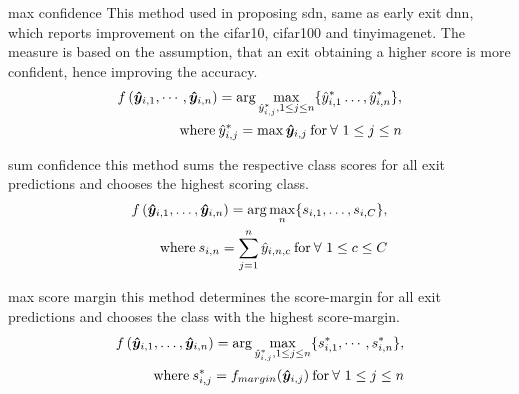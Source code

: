 \begin{enumdescript}
\begin{enumdescript}
				\item[max confidence] This method used in \cite{kaya_shallow-deep_nodate} proposing \gls{sdn}, same as early exit \gls{dnn}, which reports improvement on the \gls{cifar10}, \gls{cifar100} and \gls{tinyimagenet}. The measure is based on the assumption, that an exit obtaining a higher score is more confident, hence improving the accuracy.
				\begin{align}
				\begin{split}
				f\left(\bm{\hat{y}}_{i,1}, \cdots, \bm{\hat{y}}_{i,n} \right) = \arg \underset{{\hat{y}_{i,j}^{*}, 1 \le j 
						\le n}}{\max} \{\hat{y}_{i,1}^* \dots, \hat{y}_{i,n}^*\},\\ \text{where\:} \hat{y}_{i,j}^* = \max\bm{\hat{y}}_{i,j} \text{\:for\:} \forall \ 1 \le j \le n
				\end{split}	
				\end{align}
				\item[sum confidence] this method sums the respective class scores for all exit predictions and chooses the highest scoring class. 
				\begin{align}
				\begin{split}
				f\left(\bm{\hat{y}}_{i,1}, \dots, \bm{\hat{y}}_{i,n} \right) = \arg \underset{n}{\max} \{s_{i,1}, \dots, s_{i,C}\}, \\ \text{where\:} s_{i,n} = \sum_{j=1}^{n}\hat{y}_{i,n,c} \text{\:for\:} \forall \ 1\le c \le C
				\end{split}
				\end{align}

%
				
				\item[max score margin] this method determines the score-margin for all exit predictions and chooses the class with the highest score-margin. 
				\begin{align}
				\begin{split}
				f\left(\bm{\hat{y}}_{i,1}, \dots, \bm{\hat{y}}_{i,n} \right) = \arg \underset{\hat{y}_{i,j}^{*}, 1 \le j 
						\le n}{\max} \{s^{*}_{i,1}, \cdots, s^{*}_{i,n}\},\\ \text{where\:} s^{*}_{i,j} = f_{margin}(\bm{\hat{y}}_{i,j}) \text{\:for\:} \forall \ 1 \le j \le n
				\end{split}	
				\end{align}
		\end{enumdescript}
	\end{enumdescript}  




